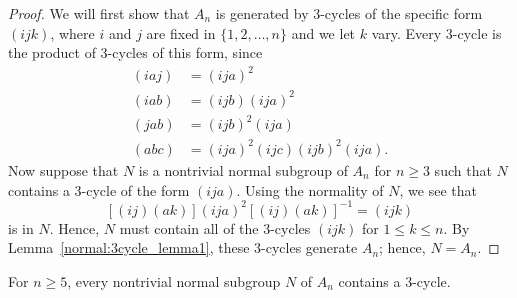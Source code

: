  
\begin{proof}
We will first show that $A_n$ is generated by 3-cycles of the specific
form $(ijk)$, where $i$ and $j$ are fixed in  $\{ 1, 2, \ldots, n \}$
and we let $k$ vary. Every 3-cycle is the product of 3-cycles of this 
form, since
\begin{align*}
(i a j) & = (i j a)^2  \\
(i a b) & = (i j b) (i j a)^2 \\
(j a b) & = (i j b)^2 (i j a) \\
(a b c) & = (i j a)^2 (i j c) (i j b)^2 (i j a).
\end{align*}
Now suppose that $N$ is a nontrivial normal subgroup of $A_n$ for $n 
\geq 3$  such that $N$ contains a 3-cycle of the form $(i j a)$. Using
the normality of $N$, we see that
\[
[(i j)(a k)](i j a)^2 [(i j)(a k)]^{-1} = (i j k)
\]
is in $N$. Hence, $N$ must contain all of the 3-cycles $(i j k)$ 
for $1 \leq k \leq n$. By Lemma~\ref{normal:3cycle_lemma1}, these 3-cycles generate $A_n$; 
hence, $N = A_n$. 
\end{proof}
 
 
\begin{lemma}\label{normal:3cycle_lemma3}
For $n \geq 5$, every nontrivial normal subgroup $N$ of $A_n$ contains a
$3$-cycle. 
\end{lemma}

 
